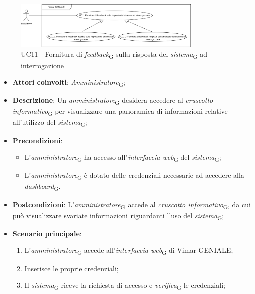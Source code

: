 \begin{figure}[H]
\centering
\includegraphics[width=0.8\textwidth]{contents/casi_duso/png/UC11.png}
\caption{UC11 - Fornitura di \textit{feedback}\textsubscript{G} sulla risposta del \textit{sistema}\textsubscript{G} ad interrogazione}
\end{figure}

\begin{itemize}
    \item \textbf{Attori coinvolti}: \textit{Amministratore}\textsubscript{G};
    \item \textbf{Descrizione}: Un \textit{amministratore}\textsubscript{G} desidera accedere al \textit{cruscotto informativo}\textsubscript{G} per visualizzare una panoramica di informazioni relative all’utilizzo del \textit{sistema}\textsubscript{G};
    \item \textbf{Precondizioni}: 
        \begin{itemize}
            \item L’\textit{amministratore}\textsubscript{G} ha accesso all’\textit{interfaccia web}\textsubscript{G} del \textit{sistema}\textsubscript{G};
            \item L’\textit{amministratore}\textsubscript{G} è dotato delle credenziali necessarie ad accedere alla \textit{dashboard}\textsubscript{G}.
        \end{itemize}
    \item \textbf{Postcondizioni}: L’\textit{amministratore}\textsubscript{G} accede al \textit{cruscotto informativo}\textsubscript{G}, da cui può visualizzare svariate informazioni riguardanti l’uso del \textit{sistema}\textsubscript{G};
    \item \textbf{Scenario principale}:
    \begin{enumerate}
    \item L’\textit{amministratore}\textsubscript{G} accede all’\textit{interfaccia web}\textsubscript{G} di Vimar GENIALE;
    \item Inserisce le proprie credenziali;
    \item Il \textit{sistema}\textsubscript{G} riceve la richiesta di accesso e \textit{verifica}\textsubscript{G} le credenziali;

\end{enumerate}
\end{itemize}
